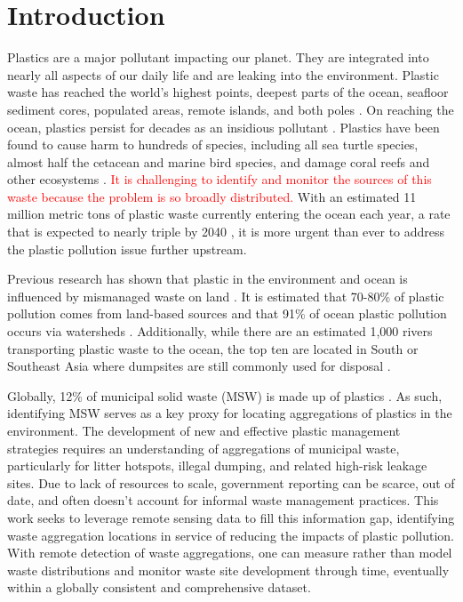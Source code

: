 \documentclass[10pt,letterpaper]{article}
\begin{document}
\linenumbers

\section*{Introduction}
Plastics are a major pollutant impacting our planet. They are integrated into nearly all aspects of our daily life and are leaking into the environment. Plastic waste has reached the world’s highest points, deepest parts of the ocean, seafloor sediment cores, populated areas, remote islands, and both poles \cite{napper2021abundance}\cite{chiba2018human}\cite{kelly2020microplastic}\cite{brandon2019multidecadal}\cite{lavers2020entrapment}\cite{browne2011accumulation}. On reaching the ocean, plastics persist for decades as an insidious pollutant \cite{lebreton2019global}\cite{worm2017plastic}. Plastics have been found to cause harm to hundreds of species, including all sea turtle species, almost half the cetacean and marine bird species, and damage coral reefs and other ecosystems \cite{harding2016marine}\cite{lamb2018plastic}\cite{beaumont2019global}. \textcolor{red}{It is challenging to identify and monitor the sources of this waste because the problem is so broadly distributed.} With an estimated 11 million metric tons of plastic waste currently entering the ocean each year, a rate that is expected to nearly triple by 2040 \cite{lau2020evaluating}, it is more urgent than ever to address the plastic pollution issue further upstream.

Previous research has shown that plastic in the environment and ocean is influenced by mismanaged waste on land \cite{jambeck2015plastic}\cite{lebreton2019future}\cite{borrelle2020predicted}. It is estimated that 70-80\% of plastic pollution comes from land-based sources and that 91\% of ocean plastic pollution occurs via watersheds \cite{li2020global}\cite{lebreton2019future}. Additionally, while there are an estimated 1,000 rivers transporting plastic waste to the ocean, the top ten are located in South or Southeast Asia where dumpsites are still commonly used for disposal \cite{meijer2021more}\cite{dhokhikah2012solid}\cite{kaza2018waste}.

Globally, 12\% of municipal solid waste (MSW) is made up of plastics \cite{kaza2018waste}. As such, identifying MSW serves as a key proxy for locating aggregations of plastics in the environment. The development of new and effective plastic management strategies requires an understanding of aggregations of municipal waste, particularly for litter hotspots, illegal dumping, and related high-risk leakage sites. Due to lack of resources to scale, government reporting can be scarce, out of date, and often doesn’t account for informal waste management practices. This work seeks to leverage remote sensing data to fill this information gap, identifying waste aggregation locations in service of reducing the impacts of plastic pollution. With remote detection of waste aggregations, one can measure rather than model waste distributions and monitor waste site development through time, eventually within a globally consistent and comprehensive dataset.
\end{document}
